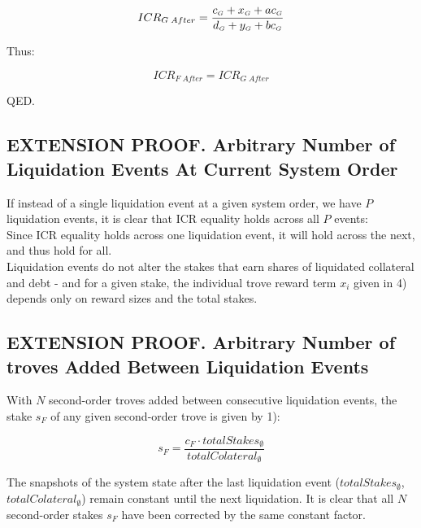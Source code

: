 \documentclass[reqno]{article}
\begin{document}
\begin{equation} 
    ICR_{G \; After}=\frac{c_\mathsmaller{G}+x_\mathsmaller{G}+ac_\mathsmaller{G}}{d_\mathsmaller{G}+y_\mathsmaller{G}+bc_\mathsmaller{G}}
\end{equation}

\bigskip
Thus:

\begin{equation} 
    ICR_{F \; After}=ICR_{G \; After}
\end{equation}

\bigskip
QED.

\subsection{EXTENSION PROOF. Arbitrary Number of Liquidation Events At Current System Order}

If instead of a single liquidation event at a given system order, we have $P$ liquidation events, it is clear that ICR equality holds across all $P$ events:\\

Since ICR equality holds across one liquidation event, it will hold across the next, and thus hold for all.\\

Liquidation events do not alter the stakes that earn shares of liquidated collateral and debt - and for a given stake, the individual trove reward term $x_i$ given in 4) depends only on reward sizes and the total stakes.

\subsection{EXTENSION PROOF. Arbitrary Number of troves Added Between Liquidation Events}

With $N$ second-order troves added between consecutive liquidation events, the stake $s_F$ of any given second-order trove is given by 1): 

\begin{equation} 
    s_F=\frac{c_F \cdot totalStakes_\emptyset}{totalColateral_\emptyset}
\end{equation}

\bigskip
The snapshots of the system state after the last liquidation event ($totalStakes_\emptyset$, $totalColateral_\emptyset$) remain constant until the next liquidation. It is clear that all $N$ second-order stakes $s_F$ have been corrected by the same constant factor.\\
\end{document}
